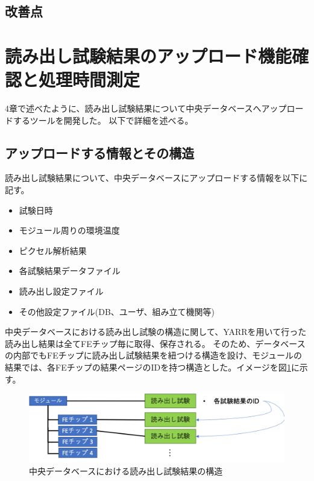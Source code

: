 \subsection{改善点}

\section{読み出し試験結果のアップロード機能確認と処理時間測定}
4章で述べたように、読み出し試験結果について中央データベースへアップロードするツールを開発した。
以下で詳細を述べる。
\subsection{アップロードする情報とその構造}
読み出し試験結果について、中央データベースにアップロードする情報を以下に記す。
\begin{itemize}
  \item 試験日時
  \item モジュール周りの環境温度
  \item ピクセル解析結果 
  \item 各試験結果データファイル
  \item 読み出し設定ファイル
  \item その他設定ファイル(DB、ユーザ、組み立て機関等)
\end{itemize}

中央データベースにおける読み出し試験の構造に関して、YARRを用いて行った読み出し結果は全てFEチップ毎に取得、保存される。
そのため、データベースの内部でもFEチップに読み出し試験結果を紐つける構造を設け、モジュールの結果では、各FEチップの結果ページのIDを持つ構造とした。イメージを図\ref{structure_for_electrical_tests}に示す。

\begin{figure}[bpt]\centering
  \begin{center}
  \includegraphics[width=13cm]{structure_for_electrical_tests.png}
  \caption[中央データベースにおける読み出し試験結果の構造]{中央データベースにおける読み出し試験結果の構造}
  \label{structure_for_electrical_tests}
  \end{center}
\end{figure}

